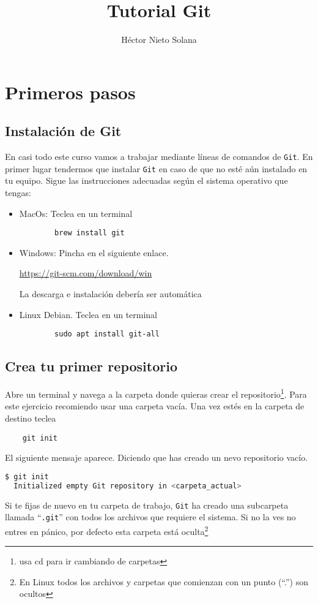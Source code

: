 \documentclass[a4paper,10pt]{report}
\title{Tutorial Git}
\author{Héctor Nieto Solana}
\begin{document}
 \maketitle
 \chapter{Primeros pasos}
  \section{Instalación de Git}
    En casi todo este curso vamos a trabajar mediante líneas de comandos de \verb+Git+. En primer lugar tendermos que instalar \verb+Git+ en caso de que no esté aún instalado en tu equipo. Sigue las instrucciones adecuadas según el sistema operativo que tengas: 
    
      \begin{itemize}
      \item MacOs: Teclea en un terminal
        \begin{verbatim}
        brew install git
        \end{verbatim}

      \item Windows: Pincha en el siguiente enlace. 
      
      \url{https://git-scm.com/download/win}
      
      La descarga e instalación debería ser automática
        
      \item Linux Debian. Teclea en un terminal
        \begin{verbatim}
        sudo apt install git-all
        \end{verbatim}
      \end{itemize}
      
  \section{Crea tu primer repositorio}
    Abre un terminal y navega a la carpeta donde quieras crear el repositorio\footnote{usa cd para ir cambiando de carpetas}. Para este ejercicio recomiendo usar una carpeta vacía. Una vez estés en la carpeta de destino teclea
    \begin{verbatim}
    git init
    \end{verbatim}
  
    El siguiente mensaje aparece. Diciendo que has creado un nevo repositorio vacío.
    \begin{lstlisting}[language=bash, frame=single]
$ git init
  Initialized empty Git repository in <carpeta_actual>
    \end{lstlisting}
    Si te fijas de nuevo en tu carpeta de trabajo, \verb+Git+ ha creado una subcarpeta llamada ``\verb+.git+'' con todos los archivos que requiere el sistema. Si no la ves no entres en pánico, por defecto esta carpeta está oculta\footnote{En Linux todos los archivos y carpetas que comienzan con un punto (``.'') son ocultos}
  
\end{document}
